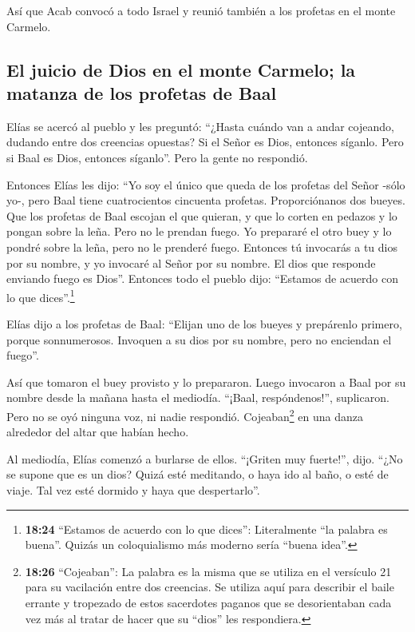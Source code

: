  Así que Acab convocó a todo Israel y reunió también a
los profetas en el monte Carmelo.

\hypertarget{el-juicio-de-dios-en-el-monte-carmelo-la-matanza-de-los-profetas-de-baal}{%
\subsection{El juicio de Dios en el monte Carmelo; la matanza de los
profetas de
Baal}\label{el-juicio-de-dios-en-el-monte-carmelo-la-matanza-de-los-profetas-de-baal}}

 Elías se acercó al pueblo y les preguntó: ``¿Hasta
cuándo van a andar cojeando, dudando entre dos creencias opuestas? Si el
Señor es Dios, entonces síganlo. Pero si Baal es Dios, entonces
síganlo''. Pero la gente no respondió.

 Entonces Elías les dijo: ``Yo soy el único que queda de
los profetas del Señor -sólo yo-, pero Baal tiene cuatrocientos
cincuenta profetas.  Proporciónanos dos bueyes. Que los
profetas de Baal escojan el que quieran, y que lo corten en pedazos y lo
pongan sobre la leña. Pero no le prendan fuego. Yo prepararé el otro
buey y lo pondré sobre la leña, pero no le prenderé fuego.
 Entonces tú invocarás a tu dios por su nombre, y yo
invocaré al Señor por su nombre. El dios que responde enviando fuego es
Dios''. Entonces todo el pueblo dijo: ``Estamos de acuerdo con lo que
dices''.\footnote{\textbf{18:24} ``Estamos de acuerdo con lo que
  dices'': Literalmente ``la palabra es buena''. Quizás un coloquialismo
  más moderno sería ``buena idea''.}

 Elías dijo a los profetas de Baal: ``Elijan uno de los
bueyes y prepárenlo primero, porque sonnumerosos. Invoquen a su dios por
su nombre, pero no enciendan el fuego''.

 Así que tomaron el buey provisto y lo prepararon. Luego
invocaron a Baal por su nombre desde la mañana hasta el mediodía.
``¡Baal, respóndenos!'', suplicaron. Pero no se oyó ninguna voz, ni
nadie respondió. Cojeaban\footnote{\textbf{18:26} ``Cojeaban'': La
  palabra es la misma que se utiliza en el versículo 21 para su
  vacilación entre dos creencias. Se utiliza aquí para describir el
  baile errante y tropezado de estos sacerdotes paganos que se
  desorientaban cada vez más al tratar de hacer que su ``dios'' les
  respondiera.} en una danza alrededor del altar que habían hecho.

 Al mediodía, Elías comenzó a burlarse de ellos.
``¡Griten muy fuerte!'', dijo. ``¿No se supone que es un dios? Quizá
esté meditando, o haya ido al baño, o esté de viaje. Tal vez esté
dormido y haya que despertarlo''.

